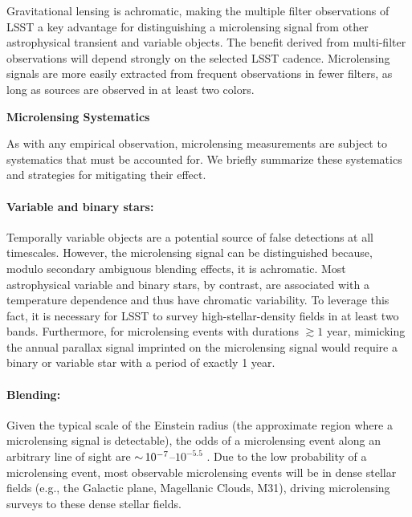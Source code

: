 

Gravitational lensing is achromatic, making the multiple filter observations of LSST a key advantage for distinguishing a microlensing signal from other astrophysical transient and variable objects.
The benefit derived from multi-filter observations will depend strongly on the selected LSST cadence. 
Microlensing signals are more easily extracted from frequent observations in fewer filters, as long as sources are observed in at least two colors. 


\noindent \textbf{Microlensing Systematics}

As with any empirical observation, microlensing measurements are subject to systematics that must be accounted for.
We briefly summarize these systematics and strategies for mitigating their effect.

\paragraph{Variable and binary stars:} Temporally variable objects are a potential source of false detections at all timescales. However, the microlensing signal can be distinguished because, modulo secondary ambiguous blending effects, it is achromatic. Most astrophysical variable and binary stars, by contrast, are associated with a temperature dependence and thus have chromatic variability. To leverage this fact, it is necessary for LSST to survey high-stellar-density fields in at least two bands. Furthermore, for microlensing events with durations $\gtrsim 1$ year, mimicking the annual parallax signal imprinted on the microlensing signal would require a binary or variable star with a period of exactly 1 year.

\paragraph{Blending:} Given the typical scale  of the Einstein radius (the approximate region where a microlensing signal is detectable), the odds of a microlensing event along an arbitrary line of sight are $ {\sim}\, 10^{-7}$--$10^{-5.5}$ \citep[\eg][]{2000ApJ...541..734A}.
Due to the low probability of a microlensing event, most observable microlensing events will be in dense stellar fields (e.g., the Galactic plane, Magellanic Clouds, M31), driving microlensing surveys to these dense stellar fields.

